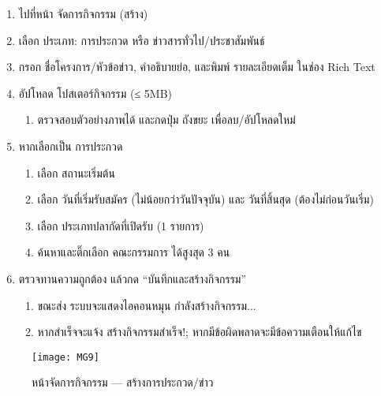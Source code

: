 \par

\begin{sloppypar}
	\begin{enumerate}
		\item ไปที่หน้า จัดการกิจกรรม (สร้าง)
		\item เลือก ประเภท: การประกวด หรือ ข่าวสารทั่วไป/ประชาสัมพันธ์
		\item กรอก ชื่อโครงการ/หัวข้อข่าว, คำอธิบายย่อ, และพิมพ์ รายละเอียดเต็ม ในช่อง Rich Text
		\item อัปโหลด โปสเตอร์กิจกรรม (≤ 5MB)
		\begin{enumerate}
			\item ตรวจสอบตัวอย่างภาพได้ และกดปุ่ม ถังขยะ เพื่อลบ/อัปโหลดใหม่
		\end{enumerate}
		\item หากเลือกเป็น การประกวด
		\begin{enumerate}
			\item เลือก สถานะเริ่มต้น
			\item เลือก วันที่เริ่มรับสมัคร (ไม่น้อยกว่าวันปัจจุบัน) และ วันที่สิ้นสุด (ต้องไม่ก่อนวันเริ่ม)
			\item เลือก ประเภทปลากัดที่เปิดรับ (1 รายการ)
			\item ค้นหาและติ๊กเลือก คณะกรรมการ ได้สูงสุด 3 คน
		\end{enumerate}
		\item ตรวจทานความถูกต้อง แล้วกด “บันทึกและสร้างกิจกรรม”
		\begin{enumerate}
			\item ขณะส่ง ระบบจะแสดงไอคอนหมุน กำลังสร้างกิจกรรม...
			\item หากสำเร็จจะแจ้ง สร้างกิจกรรมสำเร็จ!; หากมีข้อผิดพลาดจะมีข้อความเตือนให้แก้ไข
		\end{enumerate}
	\end{enumerate}
\end{sloppypar}

\vspace{\baselineskip}

\begin{figure}[h]
	\centering
	\texttt{[image: MG9]}
	\caption{หน้าจัดการกิจกรรม — สร้างการประกวด/ข่าว}
\end{figure}

\par

